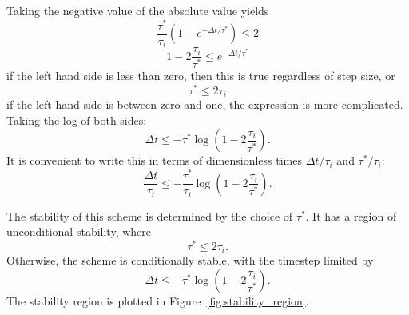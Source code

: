 \documentclass[preprint,12pt,authoryear]{elsarticle}
\begin{document}
Taking the negative value of the absolute value yields
\begin{equation}
  \frac{\tau^*}{\tau_i} \left(1-e^{-\Delta t/\tau^*} \right)  \le 2
\end{equation}
\begin{equation}
 1 - 2 \frac{\tau_i}{\tau^*} \le e^{-\Delta t/\tau^*}
\end{equation}
if the left hand side is less than zero, then this is true regardless of step size, or
\begin{equation}
\tau^* \le 2 \tau_i
\end{equation}
if the left hand side is between zero and one, the expression is more complicated. 
Taking the log of both sides:
\begin{equation}
\Delta t \le -\tau^* \log \left(1 - 2 \frac{\tau_i}{\tau^*} \right).
\end{equation}
It is convenient to write this in terms of dimensionless times $\Delta t/ \tau_i$ and $\tau^*/\tau_i$:
\begin{equation}
\frac{\Delta t}{\tau_i} \le -\frac{\tau^*}{\tau_i} \log \left(1 - 2 \frac{\tau_i}{\tau^*} \right).
\end{equation}

\fi

The stability of this scheme is determined by the choice of $\tau^*$.  
It has a region of unconditional stability, where
\begin{equation}
\tau^* \le 2 \tau_i.
\end{equation}
Otherwise, the scheme is conditionally stable, with the timestep limited by 
\begin{equation}
\Delta t \le -\tau^* \log \left(1 - 2 \frac{\tau_i}{\tau^*} \right).
\end{equation}
The stability region is plotted in Figure~\ref{fig:stability_region}. 
\end{document}
